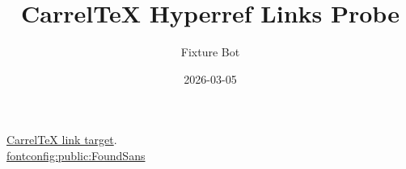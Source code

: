 \documentclass{article}
\title{CarrelTeX Hyperref Links Probe}
\author{Fixture Bot}
\date{2026-03-05}
\begin{document}
\maketitle

\href{https://example.com/carreltex}{CarrelTeX link target}.\\
\url{fontconfig:public:FoundSans}
\end{document}

